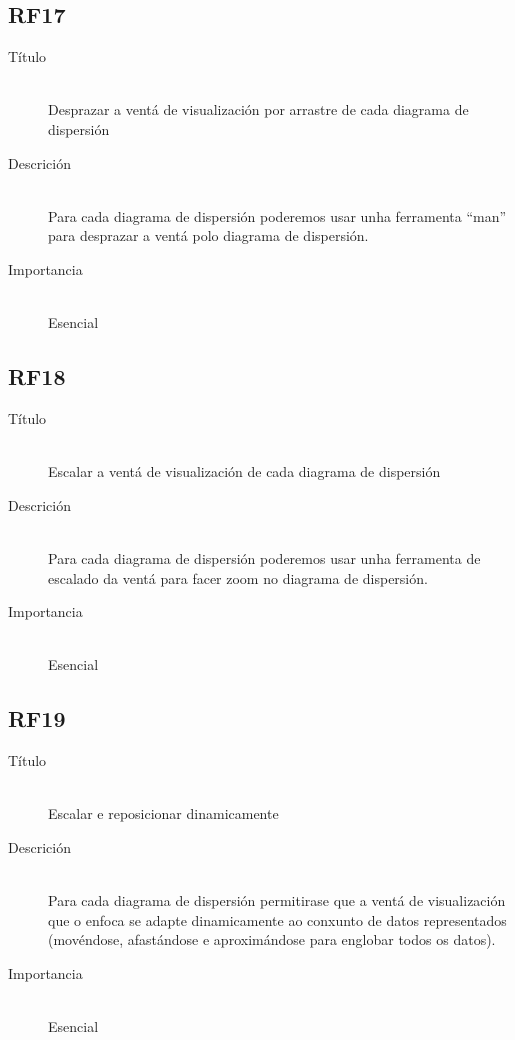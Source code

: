 \subsection*{RF17}
\begin{description}
\item[Título] \hfill \\
Desprazar a ventá de visualización por arrastre de cada diagrama de dispersión
\item[Descrición] \hfill \\
Para cada diagrama de dispersión poderemos usar unha ferramenta ``man'' para desprazar a ventá polo diagrama de dispersión.
\item[Importancia] \hfill \\
Esencial
\end{description}

\subsection*{RF18}
\begin{description}
\item[Título] \hfill \\
Escalar a ventá de visualización de cada diagrama de dispersión
\item[Descrición] \hfill \\
Para cada diagrama de dispersión poderemos usar unha ferramenta de escalado da ventá para facer zoom no diagrama de dispersión.
\item[Importancia] \hfill \\
Esencial
\end{description}

\subsection*{RF19}
\begin{description}
\item[Título] \hfill \\
Escalar e reposicionar dinamicamente
\item[Descrición] \hfill \\
Para cada diagrama de dispersión permitirase que a ventá de visualización que o enfoca se adapte dinamicamente ao conxunto de datos representados (movéndose, afastándose e aproximándose para englobar todos os datos).
\item[Importancia] \hfill \\
Esencial
\end{description}

